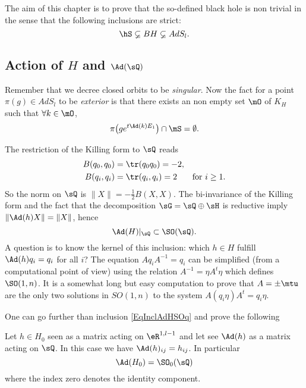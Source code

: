The aim of this chapter is to prove that the so-defined black hole is non trivial in the sense that the following inclusions are strict:
\begin{equation}		\label{EqhSssubBH}
    \hS\varsubsetneq BH\varsubsetneq AdS_l.
\end{equation}

\subsection{Action of \texorpdfstring{$H$}{H} and \texorpdfstring{$\Ad(\sQ)$}{AdQ}}

Remember that we decree closed orbits to be \emph{singular}. Now the fact for a point $\pi(g)\in AdS_l$ to be \emph{exterior} is that there exists an non empty set $\mO$ of $K_H$ such that $\forall k\in\mO$,
\[
  \pi\big( g e^{t\Ad(k)E_1}  \big)\cap\mS=\emptyset.
\]

The restriction of the Killing form to $\sQ$ reads
\begin{subequations}
\begin{align}
	B(q_0,q_0)&=\tr(q_0q_0)=-2,\\
	B(q_{i},q_{i})&=\tr(q_{i},q_{i})=2&\textrm{for $i\geq 1$}.
\end{align}
\end{subequations}
So the norm on $\sQ$ is $\| X \|=-\frac{ 1 }{2}B(X,X)$. The bi-invariance of the Killing form and the fact that the decomposition $\sG=\sQ\oplus\sH$ is reductive  imply $\| \Ad(h)X \|=\| X \|$, hence
\begin{equation}  \label{EqInclAdHSOq}
  \Ad(H)|_{\sQ}\subset\SO(\sQ).
\end{equation} 
A question is to know the kernel of this inclusion: which $h\in H$ fulfill $\Ad(h)q_i=q_i$ for all $i$? The equation $Aq_iA^{-1}=q_i$ can be simplified (from a computational point of view) using the relation $A^{-1}=\eta A^t\eta$ which defines $\SO(1,n)$. It is a somewhat long but easy computation to prove that $A=\pm\mtu$ are the only two solutions in $SO(1,n)$ to the system $A(q_i\eta)A^t=q_i\eta$.

One can go further than inclusion \eqref{EqInclAdHSOq} and prove the following
\begin{proposition}		
 Let $h\in H_0$ seen as a matrix acting on $\eR^{1,l-1}$ and let see $\Ad(h)$ as a matrix acting on $\sQ$. In this case we have $\Ad(h)_{ij}=h_{ij}$. In particular
\begin{equation}
   \Ad(H_0)=\SO_0(\sQ)
\end{equation} 
where the index zero denotes the identity component.
\label{PropSOADHequal}
\end{proposition}

